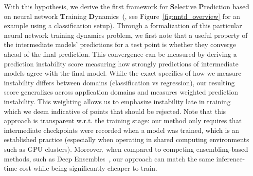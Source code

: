 With this hypothesis, we derive the first framework for \textbf{S}elective \textbf{P}rediction based on neural network \textbf{T}raining \textbf{D}ynamics~(\sptd, see Figure~\ref{fig:nntd_overview} for an example using a classification setup). Through a formalization of this particular neural network training dynamics problem, we first note that a useful property of the intermediate models' predictions for a test point is whether they converge ahead of the final prediction. This convergence can be measured by deriving a prediction instability score measuring how strongly predictions of intermediate models agree with the final model. While the exact specifics of how we measure instability differs between domains (classification vs regression), our resulting score generalizes across application domains and measures weighted prediction instability. This weighting allows us to emphasize instability late in training which we deem indicative of points that should be rejected. Note that this approach is transparent w.r.t. the training stage: our method only requires that intermediate checkpoints were recorded when a model was trained, which is an established practice (especially when operating in shared computing environments such as GPU clusters). Moreover, when compared to competing ensembling-based methods, such as Deep Ensembles~\citep{balaji2017uncertainty}, our approach can match the same inference-time cost while being significantly cheaper to train.

